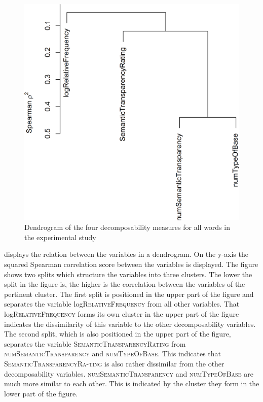  \begin{figure}
 	
 	\includegraphics[scale=0.5]{images/Experiment/clusterAnalysisDecomposabilityExperimentAllTokens.png}
 	\caption{ Dendrogram of the four decomposability measures for all words in the experimental study}
 	\label{fig:cluster experiment all affixes}
 \end{figure}
 
 displays the relation between the variables in a dendrogram. On the y-axis the squared Spearman correlation score between the variables is displayed. 
The figure shows two splits which structure the variables into three clusters. The lower the split in the figure is, the higher is the correlation between the variables of the pertinent cluster.
The first split is positioned in the upper part of the figure and separates the  variable log\textsc{RelativeFrequency} from all other variables. That log\textsc{RelativeFrequency} forms its own cluster in the upper part of the figure indicates the dissimilarity of this variable to the other decomposability variables. 
The second split, which is also positioned in the upper part of the figure, separates the variable \textsc{SemanticTransparencyRating} from \textsc{numSemanticTransparency} and \textsc{numTypeOfBase}. This indicates that \textsc{SemanticTransparencyRa-ting} is also rather dissimilar from the other decomposability variables. 
\textsc{numSemanticTransparency} and \textsc{numTypeOfBase} are much more similar to each other. This is indicated by the cluster they form in the lower part of the figure. 

